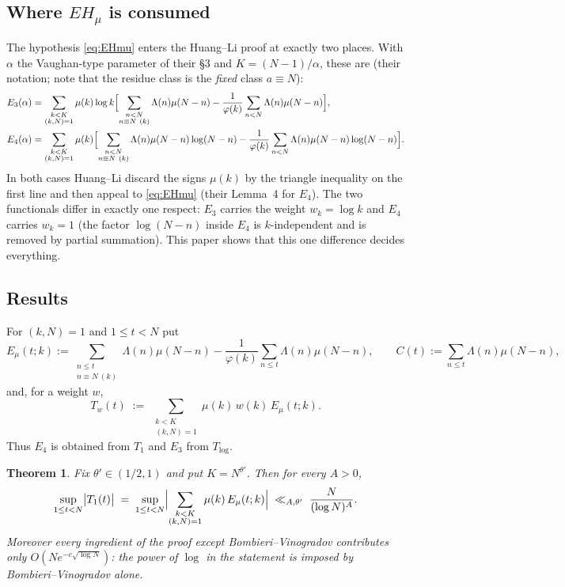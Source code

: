 \documentclass[11pt,a4paper]{article}
\theoremstyle{plain}
\newtheorem{theorem}{Theorem}
\theoremstyle{definition}
\theoremstyle{remark}
\newcommand{\Emu}{E_\mu}
\begin{document}
\subsection{Where \texorpdfstring{$EH_\mu$}{EH-mu} is consumed}

The hypothesis \eqref{eq:EHmu} enters the Huang--Li proof at exactly
two places. With $\alpha$ the Vaughan-type parameter of their \S3 and
$K=(N-1)/\alpha$, these are (their notation; note that the residue
class is the \emph{fixed} class $a\equiv N$):
\begin{align}
  E_3(\alpha) &= \sum_{\substack{k<K\\ (k,N)=1}}\mu(k)\log k
    \Bigl[\sum_{\substack{n<N\\ n\equiv N\ (k)}}\Lambda(n)\mu(N-n)
      -\frac{1}{\varphi(k)}\sum_{n<N}\Lambda(n)\mu(N-n)\Bigr],
      \label{eq:E3}\\
  E_4(\alpha) &= \sum_{\substack{k<K\\ (k,N)=1}}\mu(k)
    \Bigl[\sum_{\substack{n<N\\ n\equiv N\ (k)}}\Lambda(n)\mu(N-n)\log(N-n)
      -\frac{1}{\varphi(k)}\sum_{n<N}\Lambda(n)\mu(N-n)\log(N-n)\Bigr].
      \label{eq:E4}
\end{align}
In both cases Huang--Li discard the signs $\mu(k)$ by the triangle
inequality on the first line and then appeal to \eqref{eq:EHmu} (their
Lemma~4 for $E_4$). The two functionals differ in exactly one respect:
$E_3$ carries the weight $w_k=\log k$ and $E_4$ carries $w_k=1$ (the
factor $\log(N-n)$ inside $E_4$ is $k$-independent and is removed by
partial summation). This paper shows that this one difference decides
everything.

\subsection{Results}

For $(k,N)=1$ and $1\le t<N$ put
\begin{equation}\label{eq:Emu}
  \Emu(t;k):=\sum_{\substack{n\le t\\ n\equiv N\ (k)}}\Lambda(n)\mu(N-n)
             -\frac{1}{\varphi(k)}\sum_{n\le t}\Lambda(n)\mu(N-n),
  \qquad
  C(t):=\sum_{n\le t}\Lambda(n)\mu(N-n),
\end{equation}
and, for a weight $w$,
\[
  T_w(t)\;:=\;\sum_{\substack{k<K\\ (k,N)=1}}\mu(k)\,w(k)\,\Emu(t;k).
\]
Thus $E_4$ is obtained from $T_1$ and $E_3$ from $T_{\log}$.

\begin{theorem}\label{thm:A}
Fix $\theta'\in(1/2,1)$ and put $K=N^{\theta'}$. Then for every $A>0$,
\[
  \sup_{1\le t<N}\bigl|T_1(t)\bigr|
  \;=\;\sup_{1\le t<N}
  \Bigl|\sum_{\substack{k<K\\(k,N)=1}}\mu(k)\,\Emu(t;k)\Bigr|
  \;\ll_{A,\theta'}\;\frac{N}{(\log N)^{A}}.
\]
Moreover every ingredient of the proof except Bombieri--Vinogradov
contributes only $O\!\left(Ne^{-c\sqrt{\log N}}\right)$: the power of
$\log$ in the statement is imposed by Bombieri--Vinogradov alone.
\end{theorem}
\end{document}

